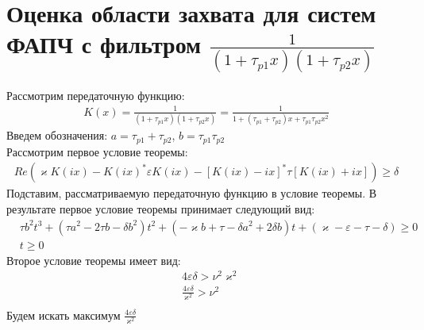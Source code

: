 \documentclass[a4paper]{article}
\begin{document}
\section{Оценка области захвата для систем ФАПЧ с фильтром $\frac{1}{(1+\tau_{p1}x)(1+\tau_{p2}x)}$}
 Рассмотрим передаточную функцию:
 \begin{equation}\label{filter1}
 \begin{aligned}
K(x) = \frac{1}{(1+\tau_{p1}x)(1+\tau_{p2}x)} = \frac{1}{1+(\tau_{p1}+\tau_{p2})x + \tau_{p1}\tau_{p2}x^2}
 \end{aligned}
\end{equation}
Введем обозначения: $a = \tau_{p1}+\tau_{p2}$, $b = \tau_{p1}\tau_{p2}$\\
Рассмотрим первое условие теоремы:
\begin{equation}
 \begin{aligned}
Re(\varkappa K(ix)-K(ix)^*\varepsilon K(ix)-[K(ix)-ix]^*\tau[K(ix)+ix])\geq\delta
 \end{aligned}
\end{equation}
Подставим, рассматриваемую передаточную функцию в условие теоремы. В результате первое условие теоремы принимает следующий вид:
\begin{equation}\label{first_condition}
 \begin{aligned}
&\tau b^2t^3 + (\tau a^2-2 \tau b - \delta b^2)t^2 + (-\varkappa b+\tau-\delta a^2 + 2\delta b)t + (\varkappa-\varepsilon-\tau-\delta) \geq 0\\
&t \geq 0
 \end{aligned}
\end{equation}
Второе условие теоремы имеет вид: 
\begin{equation}
 \begin{aligned}
&4\varepsilon\delta > \nu^2\varkappa^2\\
&\frac{4\varepsilon\delta}{\varkappa^2} > \nu^2\\
 \end{aligned}
\end{equation}
Будем искать максимум $\frac{4\varepsilon\delta}{\varkappa^2}$
\end{document}
